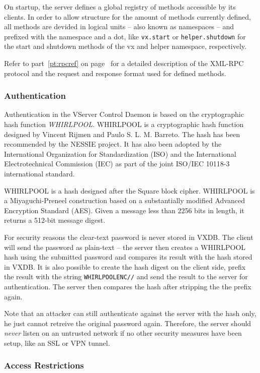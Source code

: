 On startup, the server defines a global registry of methods accessible by its
clients. In order to allow structure for the amount of methods currently
defined, all methods are devided in logical units -- also known as namespaces
-- and prefixed with the namespace and a dot, like \verb,vx.start, or
\verb,helper.shutdown, for the start and shutdown methods of the vx and helper
namespace, respectively.

Refer to part~\ref{pt:rpcref} on page~\pageref{pt:rpcref} for a detailed
description of the XML-RPC protocol and the request and response format used
for defined methods.

\subsubsection{Authentication}

Authentication in the VServer Control Daemon is based on the cryptographic hash
function \emph{WHIRLPOOL}. WHIRLPOOL is a cryptographic hash function designed
by Vincent Rijmen and Paulo S. L. M. Barreto. The hash has been recommended by
the NESSIE project. It has also been adopted by the International Organization
for Standardization (ISO) and the International Electrotechnical Commission
(IEC) as part of the joint ISO/IEC 10118-3 international standard.

WHIRLPOOL is a hash designed after the Square block cipher. WHIRLPOOL is a
Miyaguchi-Preneel construction based on a substantially modified Advanced
Encryption Standard (AES).  Given a message less than 2256 bits in length, it
returns a 512-bit message digest.

For security reasons the clear-text password is never stored in VXDB. The
client will send the password as plain-text -- the server then creates a
WHIRLPOOL hash using the submitted password and compares its result with the
hash stored in VXDB. It is also possible to create the hash digest on the client
side, prefix the result with the string \texttt{WHIRLPOOLENC//} and send the
result to the server for authentication. The server then compares the hash after 
stripping the the prefix again.

Note that an attacker can still authenticate against the server with the hash
only, he just cannot retreive the original password again. Therefore, the
server should \emph{never} listen on an untrusted network if no other security
measures have been setup, like an SSL or VPN tunnel.


\subsubsection{Access Restrictions}

